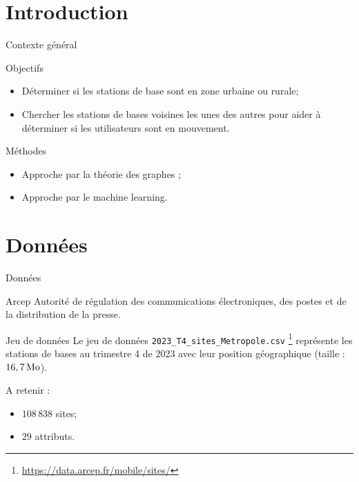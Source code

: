 \section{Introduction}
\insertsectionframe


\begin{frame}{Contexte général}

    \begin{alertblock}{Objectifs}
        \begin{itemize}
            \item Déterminer si les stations de base sont en zone urbaine ou rurale;
            \item Chercher les stations de bases voisines les unes des autres pour aider à déterminer si les utilisateurs sont en mouvement.
        \end{itemize}
    \end{alertblock}

    \begin{block}{Méthodes}
        \begin{itemize}
            \item Approche par la théorie des graphes ;
            \item Approche par le machine learning.
        \end{itemize}
    \end{block}
\end{frame}


\section{Données}
\insertsectionframe

\begin{frame}{Données}
    \begin{block}{Arcep}
        Autorité de régulation des communications électroniques, des postes et de la distribution de la presse.
    \end{block}

    \begin{block}{Jeu de données}
        Le jeu de données \texttt{2023\_T4\_sites\_Metropole.csv} \footnote{\url{https://data.arcep.fr/mobile/sites/}} représente les stations de bases au trimestre 4 de 2023 avec leur position géographique (taille : $\unit[16,7]{Mo}$).
    \end{block}

    A retenir :
    \begin{itemize}
        \item $108\,838$ sites;
        \item $29$ attributs.
    \end{itemize}
\end{frame}

